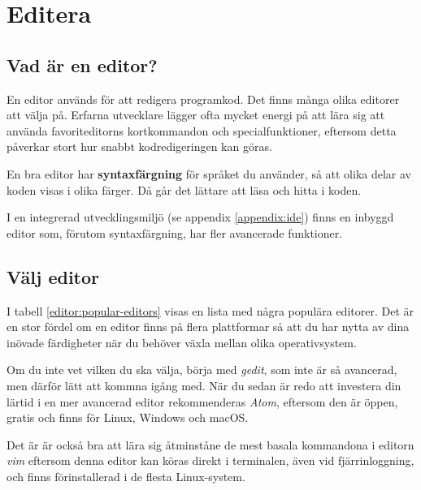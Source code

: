 
\chapter{Editera}\label{appendix:edit}
\section{Vad är en editor?}

En editor används för att redigera programkod. Det finns många olika editorer att välja på. Erfarna utvecklare lägger ofta mycket energi på att lära sig att använda favoriteditorns kortkommandon och specialfunktioner, eftersom detta påverkar stort hur snabbt kodredigeringen kan göras. 

En bra editor har \textbf{syntaxfärgning} för språket du använder, så att olika delar av koden visas i olika färger. Då går det lättare att läsa och hitta i koden. 

I en integrerad utvecklingsmiljö (se appendix \ref{appendix:ide}) finns en inbyggd editor som, förutom syntaxfärgning, har fler avancerade funktioner. 

\section{Välj editor}

I tabell \ref{editor:popular-editors} visas en lista med några populära editorer. Det är en stor fördel om en editor finns på flera plattformar så att du har nytta av dina inövade färdigheter när du behöver växla mellan olika operativsystem. 

Om du inte vet vilken du ska välja, börja med \textit{gedit}, som inte är så avancerad, men därför lätt att kommna igång med. När du sedan är redo att investera din lärtid i en mer avancerad editor rekommenderas \textit{Atom}, eftersom den är öppen, gratis och finns för Linux, Windows och macOS. 

Det är är också bra att lära sig åtminståne de mest basala kommandona i editorn \textit{vim} eftersom denna  editor kan köras direkt i terminalen, även vid fjärrinloggning, och finns förinstallerad i de flesta Linux-system.